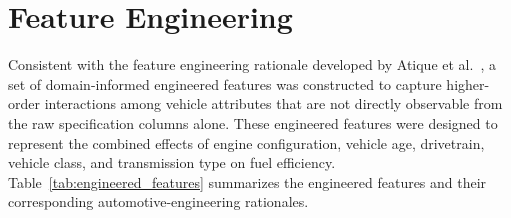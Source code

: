 \section{Feature Engineering}

Consistent with the feature engineering rationale developed by Atique et al.~\cite{atique2026explainable}, a set of domain-informed engineered features was constructed to capture higher-order interactions among vehicle attributes that are not directly observable from the raw specification columns alone. These engineered features were designed to represent the combined effects of engine configuration, vehicle age, drivetrain, vehicle class, and transmission type on fuel efficiency. Table~\ref{tab:engineered_features} summarizes the engineered features and their corresponding automotive-engineering rationales\cite{atique2026explainable}.

